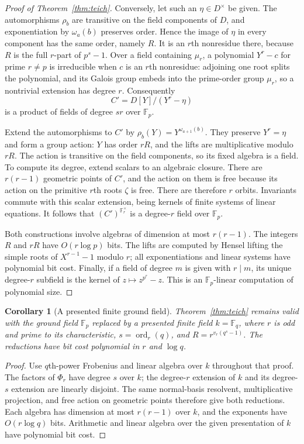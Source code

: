 \documentclass[11pt]{article}
\newcommand{\F}{\mathbb F}
\newcommand{\ord}{\operatorname{ord}}
\newtheorem{corollary}[theorem]{Corollary}
\theoremstyle{definition}
\theoremstyle{remark}
\begin{document}
\begin{proof}[Proof of Theorem~\ref{thm:teich}]
Conversely, let such an $\eta\in D^\times$ be given.
The automorphisms $\rho_b$ are transitive on the field
components of $D$, and exponentiation by $\omega_a(b)$
preserves order.  Hence the image of $\eta$ in every component
has the same order, namely $R$.  It is an $r$th nonresidue
there, because $R$ is the full $r$-part of $p^s-1$.
Over a field containing $\mu_r$, a polynomial $Y^r-c$ for
prime $r\ne p$ is irreducible when $c$ is an $r$th nonresidue:
adjoining one root splits the polynomial, and its Galois group
embeds into the prime-order group $\mu_r$, so a nontrivial
extension has degree $r$.
Consequently
\[
 C'=D[Y]/(Y^r-\eta)
\]
is a product of fields of degree $sr$ over $\F_p$.

Extend the automorphisms to $C'$ by
$\rho_b(Y)=Y^{\omega_{a+1}(b)}$.
They preserve $Y^r=\eta$ and form a group action: $Y$ has
order $rR$, and the lifts are multiplicative modulo $rR$.
The action is transitive on the field components, so its
fixed algebra is a field.  To compute its degree, extend
scalars to an algebraic closure.  There are $r(r-1)$ geometric
points of $C'$, and the action on them is free because its
action on the primitive $r$th roots $\zeta$ is free.
There are therefore $r$ orbits.  Invariants commute with
this scalar extension, being kernels of finite systems of
linear equations.  It follows that $(C')^{\F_r^\times}$
is a degree-$r$ field over $\F_p$.

Both constructions involve algebras of dimension at most
$r(r-1)$.  The integers $R$ and $rR$ have $O(r\log p)$
bits.  The lifts are computed by Hensel lifting the simple
roots of $X^{r-1}-1$ modulo $r$; all exponentiations and
linear systems have polynomial bit cost.  Finally, if a
field of degree $m$ is given with $r\mid m$, its unique
degree-$r$ subfield is the kernel of $z\mapsto z^{p^r}-z$.
This is an $\F_p$-linear computation of polynomial size.
\end{proof}

\begin{corollary}[A presented finite ground field]\label{cor:teich-basefield}
Theorem~\ref{thm:teich} remains valid with the ground field
$\F_p$ replaced by a presented finite field $k=\F_q$, where
$r$ is odd and prime to its characteristic, $s=\ord_r(q)$,
and $R=r^{v_r(q^s-1)}$. The reductions have bit cost polynomial
in $r$ and $\log q$.
\end{corollary}
\begin{proof}
Use $q$th-power Frobenius and linear algebra over $k$ throughout
that proof. The factors of $\Phi_r$ have degree $s$ over $k$;
the degree-$r$ extension of $k$ and its degree-$s$ extension are
linearly disjoint. The same normal-basis resolvent, multiplicative
projection, and free action on geometric points therefore give both
reductions. Each algebra has dimension at most $r(r-1)$ over $k$,
and the exponents have $O(r\log q)$ bits. Arithmetic and linear
algebra over the given presentation of $k$ have polynomial bit cost.
\end{proof}
\end{document}
